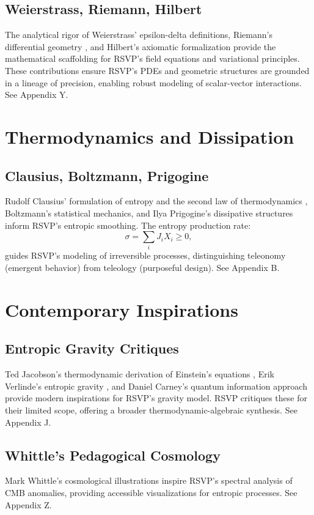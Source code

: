\documentclass[12pt]{report}
\begin{document}
\section{Weierstrass, Riemann, Hilbert}
The analytical rigor of Weierstrass’ epsilon-delta definitions, Riemann’s differential geometry \citep{Riemann1854}, and Hilbert’s axiomatic formalization \citep{Hilbert1900} provide the mathematical scaffolding for RSVP’s field equations and variational principles. These contributions ensure RSVP’s PDEs and geometric structures are grounded in a lineage of precision, enabling robust modeling of scalar-vector interactions. See Appendix Y.

\chapter{Thermodynamics and Dissipation}
\section{Clausius, Boltzmann, Prigogine}
Rudolf Clausius’ formulation of entropy and the second law of thermodynamics \citep{Clausius1865}, Boltzmann’s statistical mechanics, and Ilya Prigogine’s dissipative structures \citep{Prigogine1977} inform RSVP’s entropic smoothing. The entropy production rate:
\begin{equation}
\sigma = \sum_i J_i X_i \geq 0, \label{eq:entropy}
\end{equation}
guides RSVP’s modeling of irreversible processes, distinguishing teleonomy (emergent behavior) from teleology (purposeful design). See Appendix B.

\chapter{Contemporary Inspirations}
\section{Entropic Gravity Critiques}
Ted Jacobson’s thermodynamic derivation of Einstein’s equations \citep{Jacobson1995}, Erik Verlinde’s entropic gravity \citep{Verlinde2011}, and Daniel Carney’s quantum information approach \citep{Carney2019} provide modern inspirations for RSVP’s gravity model. RSVP critiques these for their limited scope, offering a broader thermodynamic-algebraic synthesis. See Appendix J.
\section{Whittle’s Pedagogical Cosmology}
Mark Whittle’s cosmological illustrations \citep{Whittle2008} inspire RSVP’s spectral analysis of CMB anomalies, providing accessible visualizations for entropic processes. See Appendix Z.
\end{document}
